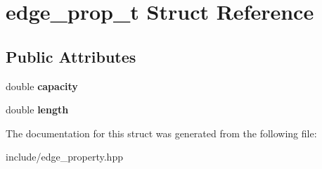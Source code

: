 \hypertarget{structedge__prop__t}{
\section{edge\_\-prop\_\-t Struct Reference}
\label{structedge__prop__t}
}
\subsection*{Public Attributes}
\begin{DoxyCompactItemize}
\item 
\hypertarget{structedge__prop__t_a66111ca33a51136b61afe01b81fdee44}{
double {\bfseries capacity}}
\label{structedge__prop__t_a66111ca33a51136b61afe01b81fdee44}

\item 
\hypertarget{structedge__prop__t_a786ebbcbe4ae1eac0206cb39182082fa}{
double {\bfseries length}}
\label{structedge__prop__t_a786ebbcbe4ae1eac0206cb39182082fa}

\end{DoxyCompactItemize}


The documentation for this struct was generated from the following file:\begin{DoxyCompactItemize}
\item 
include/edge\_\-property.hpp\end{DoxyCompactItemize}
